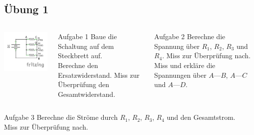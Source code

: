 \subsection*{Übung 1}
\begin{frame}
  \begin{columns}
    \begin{center}
      \includegraphics[width=1\textwidth]{e04/Uebung1_Schaltplan.pdf}
    \end{center}
    \begin{alertblock}{Aufgabe 1}
      Baue die Schaltung auf dem Steckbrett auf.\\
      Berechne den Ersatzwiderstand. Miss zur Überprüfung den Gesamtwiderstand.
    \end{alertblock}
    \begin{alertblock}{Aufgabe 2}
      Berechne die Spannung über $R_1$, $R_2$, $R_3$ und $R_4$. Miss zur Überprüfung nach.\\
      Miss und erkläre die Spannungen über $A$---$B$, $A$---$C$ und $A$---$D$.
    \end{alertblock}
   \end{columns}
  \begin{alertblock}{Aufgabe 3}
    Berechne die Ströme durch $R_1$, $R_2$, $R_3$, $R_4$ und den Gesamtstrom. Miss zur Überprüfung nach.
  \end{alertblock}
\end{frame}

